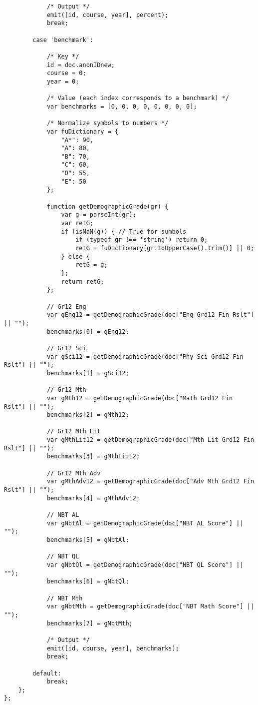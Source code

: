\begin{verbatim}
            /* Output */
            emit([id, course, year], percent);
            break;

        case 'benchmark':

            /* Key */
            id = doc.anonIDnew;
            course = 0;
            year = 0;

            /* Value (each index corresponds to a benchmark) */
            var benchmarks = [0, 0, 0, 0, 0, 0, 0, 0];

            /* Normalize symbols to numbers */
            var fuDictionary = {
                "A*": 90,
                "A": 80,
                "B": 70,
                "C": 60,
                "D": 55,
                "E": 50
            };

            function getDemographicGrade(gr) {
                var g = parseInt(gr);
                var retG;
                if (isNaN(g)) { // True for sumbols
                    if (typeof gr !== 'string') return 0;
                    retG = fuDictionary[gr.toUpperCase().trim()] || 0;
                } else {
                    retG = g;
                };
                return retG;
            };

            // Gr12 Eng
            var gEng12 = getDemographicGrade(doc["Eng Grd12 Fin Rslt"] || "");
            benchmarks[0] = gEng12;

            // Gr12 Sci
            var gSci12 = getDemographicGrade(doc["Phy Sci Grd12 Fin Rslt"] || "");
            benchmarks[1] = gSci12;

            // Gr12 Mth
            var gMth12 = getDemographicGrade(doc["Math Grd12 Fin Rslt"] || "");
            benchmarks[2] = gMth12;

            // Gr12 Mth Lit
            var gMthLit12 = getDemographicGrade(doc["Mth Lit Grd12 Fin Rslt"] || "");
            benchmarks[3] = gMthLit12;

            // Gr12 Mth Adv
            var gMthAdv12 = getDemographicGrade(doc["Adv Mth Grd12 Fin Rslt"] || "");
            benchmarks[4] = gMthAdv12;

            // NBT AL
            var gNbtAl = getDemographicGrade(doc["NBT AL Score"] || "");
            benchmarks[5] = gNbtAl;

            // NBT QL
            var gNbtQl = getDemographicGrade(doc["NBT QL Score"] || "");
            benchmarks[6] = gNbtQl;

            // NBT Mth
            var gNbtMth = getDemographicGrade(doc["NBT Math Score"] || "");
            benchmarks[7] = gNbtMth;

            /* Output */
            emit([id, course, year], benchmarks);
            break;

        default:
            break;
    };
};
\end{verbatim}


